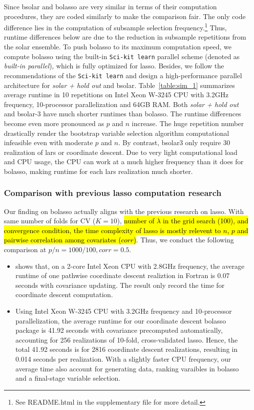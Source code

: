 \documentclass[11pt,review,authoryear]{elsarticle}
\begin{document}
Since bsolar and bolasso are very similar in terms of their computation procedures, they are coded similarly to make the comparison fair. The only code difference lies in the computation of subsample selection frequency.\footnote{See README.html in the supplementary file for more detail.} Thus, runtime differences below are due to the reduction in subsample repetitions from the solar ensemble. To push bolasso to its maximum computation speed, we compute bolasso using the built-in \texttt{Sci-kit learn} parallel scheme (denoted as \emph{built-in parallel}), which is fully optimized for lasso. Besides, we follow the recommendations of the \texttt{Sci-kit learn} and design a high-performance parallel architecture for \emph{solar + hold out} and bsolar. Table~\ref{table:sim_1} summarizes average runtime in 10 repetitions on Intel Xeon W-3245 CPU with 3.2GHz frequency, 10-processor parallelization and 64GB RAM. Both \emph{solar + hold out} and bsolar-3 have much shorter runtimes than bolasso. The runtime differences become even more pronounced as $p$ and $n$ increase. The huge repetition number drastically render the bootstrap variable selection algorithm computational infeasible even with moderate $p$ and $n$. By contrast, bsolar3 only require 30 realization of lars or coordinate descent. Due to very light computational load and CPU usage, the CPU can work at a much higher frequency than it does for bolasso, making runtime for each lars realization much shorter.

\subsubsection{Comparison with previous lasso computation research}

Our finding on bolasso actually aligns with the previous research on lasso. With same number of folds for CV ($K=10$), \hl{number of $\lambda$ in the grid search (100), and convergence condition, the time complexity of lasso is mostly relevent to $n$, $p$ and pairwise correlation among covariates ($corr$)}. Thus, we conduct the following comparison at $p/n=1000/100, corr=0.5$.

\begin{itemize}
  \item \citet[Table 1]{friedman2010regularization} shows that, on a 2-core Intel Xeon CPU with 2.8GHz frequency, the average runtime of one pathwise coordinate descent realiztion in Fortran is 0.07 seconds with covariance updating. The \citet{friedman2010regularization} result only record the time for coordinate descent computation.
  \item Using Intel Xeon W-3245 CPU with 3.2GHz frequency and 10-processor parallelization, the average runtime for our coordinate descent bolasso package is 41.92 seconds with covariance precomputed automatically, accounting for 256 realizations of 10-fold, cross-validated lasso. Hence, the total 41.92 seconds is for 2816 coordinate descent realizations, resulting in 0.014 seconds per realization. With a slightly faster CPU frequency, our average time also account for generating data, ranking varaibles in bolasso and a final-stage variable selection.
\end{itemize}
\end{document}
